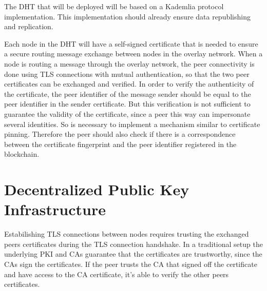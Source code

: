 The DHT that will be deployed will be based on a Kademlia protocol implementation.
This implementation should already ensure data republishing and replication.

Each node in the DHT will have a self-signed certificate that is needed to ensure a secure routing message exchange between nodes in the overlay network.
When a node is routing a message through the overlay network, the peer connectivity is done using TLS connections with mutual authentication, so that the two peer certificates can be exchanged and verified.
In order to verify the authenticity of the certificate, the peer identifier of the message sender should be equal to the peer identifier in the sender certificate.
But this verification is not sufficient to guarantee the validity of the certificate, since a peer this way can impersonate several identities.
So is necessary to implement a mechanism similar to certificate pinning.
Therefore the peer should also check if there is a correspondence between the certificate fingerprint and the peer identifier registered in the blockchain.




\section{Decentralized Public Key Infrastructure} \label{ssec:blockchain}

Estabilishing \ac{TLS} connections between nodes requires trusting the exchanged peers certificates during the \ac{TLS} connection handshake.
In a traditional setup the underlying \ac{PKI} and \acp{CA} guarantee that the certificates are trustworthy, since the \acp{CA} sign the certificates.
If the peer trusts the \ac{CA} that signed off the certificate and have access to the \ac{CA} certificate, it's able to verify the other peers certificates.

